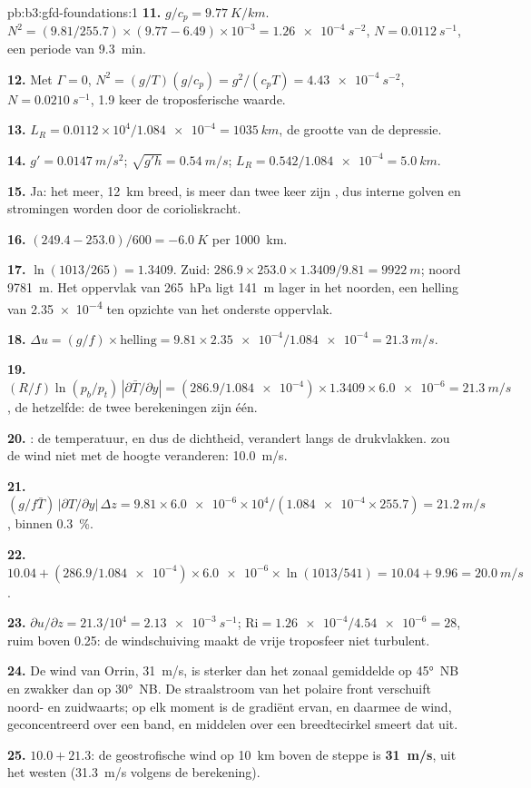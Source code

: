 \begin{solution}{pb:b3:gfd-foundations:1}
\textbf{11.} $g/c_p = \qty{9.77}{K/km}$. $N^2 = (9.81/255.7)\times(9.77 -
6.49)\times10^{-3} = \qty{1.26e-4}{s^{-2}}$, $N = \qty{0.0112}{s^{-1}}$, een
periode van \qty{9.3}{min}.

\textbf{12.} Met $\Gamma = 0$, $N^2 = (g/T)(g/c_p) = g^2/(c_pT) =
\qty{4.43e-4}{s^{-2}}$, $N = \qty{0.0210}{s^{-1}}$, 1.9 keer de
troposferische waarde.

\textbf{13.} $L_R = 0.0112\times10^4/\num{1.084e-4} = \qty{1035}{km}$, de
grootte van de depressie.

\textbf{14.} $g' = \qty{0.0147}{m/s^2}$; $\sqrt{g'h} = \qty{0.54}{m/s}$;
$L_R = 0.542/\num{1.084e-4} = \qty{5.0}{km}$.

\textbf{15.} Ja: het meer, \qty{12}{km} breed, is meer dan twee keer zijn
, dus interne golven en stromingen worden door de
corioliskracht.

\textbf{16.} $(249.4 - 253.0)/600 = \qty{-6.0}{K}$ per \qty{1000}{km}.

\textbf{17.} $\ln(1013/265) = 1.3409$. Zuid:
$286.9\times253.0\times1.3409/9.81 = \qty{9922}{m}$; noord \qty{9781}{m}.
Het oppervlak van \qty{265}{hPa} ligt \qty{141}{m} lager in het noorden, een helling van
\num{2.35e-4} ten opzichte van het onderste oppervlak.

\textbf{18.} $\Delta u = (g/f)\times\text{helling} = 9.81\times\num{2.35e-4}/
\num{1.084e-4} = \qty{21.3}{m/s}$.

\textbf{19.} $(R/f)\ln(p_b/p_t)\,|\partial\bar T/\partial y| =
(286.9/\num{1.084e-4})\times1.3409\times\num{6.0e-6} = \qty{21.3}{m/s}$, de
hetzelfde: de twee berekeningen zijn één.

\textbf{20.} : de temperatuur, en dus de dichtheid, verandert langs
de drukvlakken.  zou de wind niet met de hoogte veranderen:
\qty{10.0}{m/s}.

\textbf{21.} $(g/f\bar T)\,|\partial T/\partial y|\,\Delta z = 9.81\times
\num{6.0e-6}\times10^4/(\num{1.084e-4}\times255.7) = \qty{21.2}{m/s}$,
binnen \qty{0.3}{\percent}.

\textbf{22.} $10.04 + (286.9/\num{1.084e-4})\times\num{6.0e-6}\times
\ln(1013/541) = 10.04 + 9.96 = \qty{20.0}{m/s}$.

\textbf{23.} $\partial u/\partial z = 21.3/10^4 = \qty{2.13e-3}{s^{-1}}$;
$\mathrm{Ri} = \num{1.26e-4}/\num{4.54e-6} = 28$, ruim boven 0.25: de windschuiving
maakt de vrije troposfeer niet turbulent.

\textbf{24.} De wind van Orrin, \qty{31}{m/s}, is sterker dan het zonaal gemiddelde
op \ang{45}~NB en zwakker dan op \ang{30}~NB. De straalstroom van het polaire front verschuift
noord- en zuidwaarts; op elk moment is de gradiënt ervan, en daarmee de wind,
geconcentreerd over een band, en middelen over een breedtecirkel smeert dat uit.

\textbf{25.} $10.0 + 21.3$: de geostrofische wind op \qty{10}{km} boven de
steppe is \textbf{\qty[text-series-to-math=true]{31}{m/s}}, uit het westen
(\qty{31.3}{m/s} volgens de berekening).
\end{solution}
